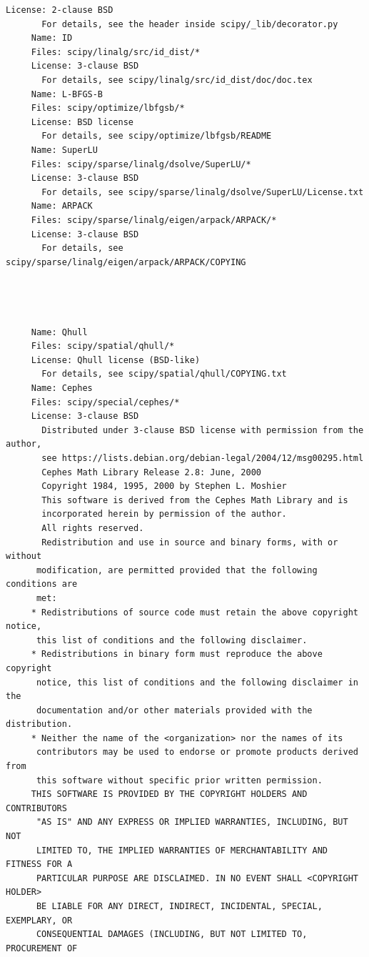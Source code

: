 \begin{lstlisting}[basicstyle=\ttfamily\footnotesize,breaklines=true]
     License: 2-clause BSD
       For details, see the header inside scipy/_lib/decorator.py
     Name: ID
     Files: scipy/linalg/src/id_dist/*
     License: 3-clause BSD
       For details, see scipy/linalg/src/id_dist/doc/doc.tex
     Name: L-BFGS-B
     Files: scipy/optimize/lbfgsb/*
     License: BSD license
       For details, see scipy/optimize/lbfgsb/README
     Name: SuperLU
     Files: scipy/sparse/linalg/dsolve/SuperLU/*
     License: 3-clause BSD
       For details, see scipy/sparse/linalg/dsolve/SuperLU/License.txt
     Name: ARPACK
     Files: scipy/sparse/linalg/eigen/arpack/ARPACK/*
     License: 3-clause BSD
       For details, see scipy/sparse/linalg/eigen/arpack/ARPACK/COPYING




     Name: Qhull
     Files: scipy/spatial/qhull/*
     License: Qhull license (BSD-like)
       For details, see scipy/spatial/qhull/COPYING.txt
     Name: Cephes
     Files: scipy/special/cephes/*
     License: 3-clause BSD
       Distributed under 3-clause BSD license with permission from the author,
       see https://lists.debian.org/debian-legal/2004/12/msg00295.html
       Cephes Math Library Release 2.8: June, 2000
       Copyright 1984, 1995, 2000 by Stephen L. Moshier
       This software is derived from the Cephes Math Library and is
       incorporated herein by permission of the author.
       All rights reserved.
       Redistribution and use in source and binary forms, with or without
      modification, are permitted provided that the following conditions are
      met:
     * Redistributions of source code must retain the above copyright notice,
      this list of conditions and the following disclaimer.
     * Redistributions in binary form must reproduce the above copyright
      notice, this list of conditions and the following disclaimer in the
      documentation and/or other materials provided with the distribution.
     * Neither the name of the <organization> nor the names of its
      contributors may be used to endorse or promote products derived from
      this software without specific prior written permission.
     THIS SOFTWARE IS PROVIDED BY THE COPYRIGHT HOLDERS AND CONTRIBUTORS
      "AS IS" AND ANY EXPRESS OR IMPLIED WARRANTIES, INCLUDING, BUT NOT
      LIMITED TO, THE IMPLIED WARRANTIES OF MERCHANTABILITY AND FITNESS FOR A
      PARTICULAR PURPOSE ARE DISCLAIMED. IN NO EVENT SHALL <COPYRIGHT HOLDER>
      BE LIABLE FOR ANY DIRECT, INDIRECT, INCIDENTAL, SPECIAL, EXEMPLARY, OR
      CONSEQUENTIAL DAMAGES (INCLUDING, BUT NOT LIMITED TO, PROCUREMENT OF

\end{lstlisting}
